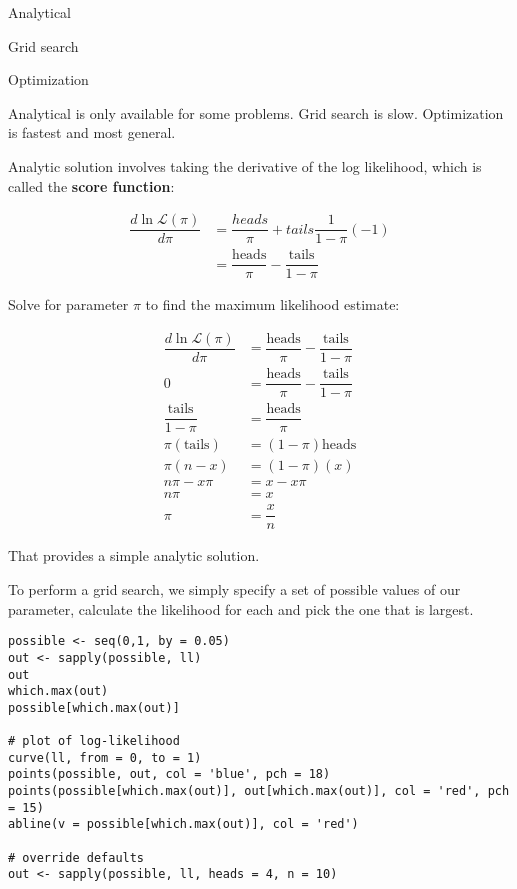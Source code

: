\documentclass[a4paper,12pt]{article}
\newcommand{\lik}{\mathcal{L}}
\begin{document}
\begin{itemize*}
\item Analytical
\item Grid search
\item Optimization
\end{itemize*}

Analytical is only available for some problems. Grid search is slow. Optimization is fastest and most general. 


Analytic solution involves taking the derivative of the log likelihood, which is called the \textbf{score function}:

\begin{align*}
\dfrac{d\ln \lik(\pi)}{d\pi} & = \dfrac{heads}{\pi} + tails \dfrac{1}{1-\pi}(-1)\\
& = \dfrac{\text{heads}}{\pi} - \dfrac{\text{tails}}{1-\pi}
\end{align*}

Solve for parameter $\pi$ to find the maximum likelihood estimate:

\begin{align*}
\dfrac{d\ln \lik(\pi)}{d\pi} & = \dfrac{\text{heads}}{\pi} - \dfrac{\text{tails}}{1-\pi}\\
0 & = \dfrac{\text{heads}}{\pi} - \dfrac{\text{tails}}{1-\pi}\\
\dfrac{\text{tails}}{1-\pi} & = \dfrac{\text{heads}}{\pi}\\
\pi(\text{tails}) & = (1-\pi)\text{heads}\\
\pi(n - x) & = (1-\pi)(x)\\
n\pi - x\pi & = x - x\pi\\
n\pi & = x\\
\pi & = \dfrac{x}{n}
\end{align*}

That provides a simple analytic solution.

To perform a grid search, we simply specify a set of possible values of our parameter, calculate the likelihood for each and pick the one that is largest.

\begin{lstlisting}
possible <- seq(0,1, by = 0.05)
out <- sapply(possible, ll)
out
which.max(out)
possible[which.max(out)]

# plot of log-likelihood
curve(ll, from = 0, to = 1)
points(possible, out, col = 'blue', pch = 18)
points(possible[which.max(out)], out[which.max(out)], col = 'red', pch = 15)
abline(v = possible[which.max(out)], col = 'red')

# override defaults
out <- sapply(possible, ll, heads = 4, n = 10)
\end{lstlisting}
\end{document}
